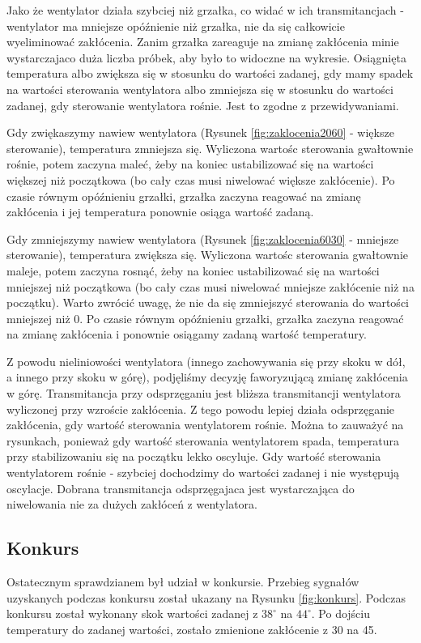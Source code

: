 \documentclass[12pt, a4paper]{article}
\begin{document}
Jako że wentylator działa szybciej niż grzałka, co widać w ich transmitancjach - wentylator ma mniejsze opóźnienie niż grzałka, nie da się całkowicie wyeliminować zakłócenia. Zanim grzałka zareaguje na zmianę zakłócenia minie wystarczajaco duża liczba próbek, aby było to widoczne na wykresie. Osiągnięta temperatura albo zwiększa się w stosunku do wartości zadanej, gdy mamy spadek na wartości sterowania wentylatora albo zmniejsza się w stosunku do wartości zadanej, gdy sterowanie wentylatora rośnie. Jest to zgodne z przewidywaniami. 

Gdy zwiękaszymy nawiew wentylatora (Rysunek \ref{fig:zaklocenia2060} - większe sterowanie), temperatura zmniejsza się. Wyliczona wartośc sterowania gwałtownie rośnie,  potem zaczyna maleć, żeby na koniec ustabilizować się na wartości większej niż początkowa (bo cały czas musi niwelować większe zakłócenie). Po czasie równym opóźnieniu grzałki, grzałka zaczyna reagować na zmianę zakłócenia i jej temperatura ponownie osiąga wartość zadaną.

Gdy zmniejszymy nawiew wentylatora (Rysunek \ref{fig:zaklocenia6030} - mniejsze sterowanie), temperatura zwiększa się. Wyliczona wartośc sterowania gwałtownie maleje, potem zaczyna rosnąć, żeby na koniec ustabilizować się na wartości mniejszej niż początkowa (bo cały czas musi niwelować mniejsze zakłócenie niż na początku). Warto zwrócić uwagę, że nie da się zmniejszyć sterowania do wartości mniejszej niż 0. Po czasie równym opóźnieniu grzałki, grzałka zaczyna reagować na zmianę zakłócenia i ponownie osiągamy zadaną wartość temperatury.

Z powodu nieliniowości wentylatora (innego zachowywania się przy skoku w dół, a innego przy skoku w górę), podjęliśmy decyzję faworyzującą zmianę zakłócenia w górę. Transmitancja przy odsprzęganiu jest bliższa transmitancji wentylatora wyliczonej przy wzroście zakłócenia. Z tego powodu lepiej działa odsprzęganie zakłócenia, gdy wartość sterowania wentylatorem rośnie. Można to zauważyć na rysunkach, ponieważ gdy wartość sterowania wentylatorem spada, temperatura przy stabilizowaniu się na początku lekko oscyluje. Gdy wartość sterowania wentylatorem rośnie - szybciej dochodzimy do wartości zadanej i nie występują oscylacje. Dobrana transmitancja odsprzęgajaca jest wystarczająca do niwelowania nie za dużych zakłóceń z wentylatora.


\subsection{Konkurs}
Ostatecznym sprawdzianem był udział w konkursie. Przebieg sygnałów uzyskanych podczas konkursu został ukazany na Rysunku \ref{fig:konkurs}. Podczas konkursu został wykonany skok wartości zadanej z $38^\circ$ na $44^\circ$. Po dojściu temperatury do zadanej wartości, zostało zmienione zakłócenie z 30 na 45. 
\end{document}
